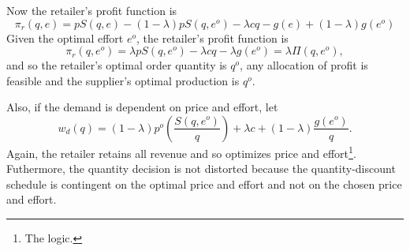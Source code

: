 Now the retailer's profit function is 
\begin{equation*}
    \pi_r(q,e)=p S(q,e)-(1-\lambda)p S(q,e^o)-\lambda c q-g(e)+(1-\lambda)g(e^o)
\end{equation*}
Given the optimal effort $e^o$, the retailer's profit function is 
$$\pi_r(q,e^o)=\lambda p S(q,e^o)-\lambda cq-\lambda g(e^o)=\lambda\Pi(q,e^o),$$
and so the retailer's optimal order quantity is $q^o$, any allocation of profit is feasible and the supplier's optimal production is $q^o$.

Also, if the demand is dependent on price and effort, let 
\begin{equation*}
    w_d(q)=(1-\lambda)p^o \left(\frac{S(q,e^o)}{q}\right)+\lambda c+(1-\lambda)\frac{g(e^o)}{q}.
\end{equation*}
Again, the retailer retains all revenue and so optimizes price and effort\footnote{The logic.}. Futhermore, the quantity decision is not distorted because the quantity-discount schedule is contingent on the optimal price and effort and not on the chosen price and effort. 



